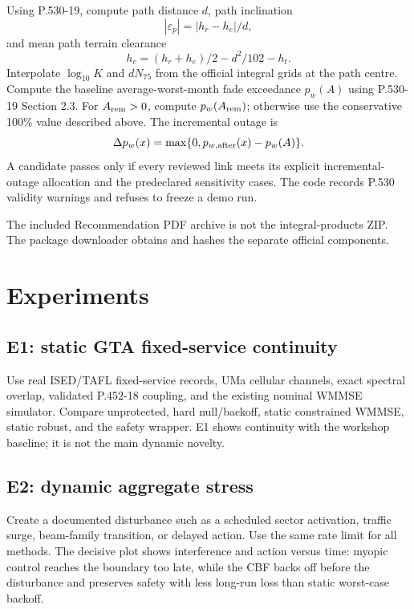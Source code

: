 \documentclass[11pt]{article}
\begin{document}
Using P.530-19, compute path distance $d$, path inclination
\begin{equation}
 |\varepsilon_p|=|h_r-h_e|/d,
\end{equation}
and mean path terrain clearance
\begin{equation}
 h_c=(h_r+h_e)/2-d^2/102-h_t.
\end{equation}
Interpolate $\log_{10}K$ and $dN_{75}$ from the official integral grids at the path centre. Compute the baseline average-worst-month fade exceedance $p_w(A)$ using P.530-19 Section 2.3. For $A_{\rm rem}>0$, compute $p_w(A_{\rm rem})$; otherwise use the conservative 100\% value described above. The incremental outage is
\begin{equation}
 \Delta p_w(x)=\max\{0,p_{w,\rm after}(x)-p_w(A)\}.
\end{equation}
A candidate passes only if every reviewed link meets its explicit incremental-outage allocation and the predeclared sensitivity cases. The code records P.530 validity warnings and refuses to freeze a demo run.

The included Recommendation PDF archive is not the integral-products ZIP. The package downloader obtains and hashes the separate official components.

\section{Experiments}

\subsection{E1: static GTA fixed-service continuity}

Use real ISED/TAFL fixed-service records, UMa cellular channels, exact spectral overlap, validated P.452-18 coupling, and the existing nominal WMMSE simulator. Compare unprotected, hard null/backoff, static constrained WMMSE, static robust, and the safety wrapper. E1 shows continuity with the workshop baseline; it is not the main dynamic novelty.

\subsection{E2: dynamic aggregate stress}

Create a documented disturbance such as a scheduled sector activation, traffic surge, beam-family transition, or delayed action. Use the same rate limit for all methods. The decisive plot shows interference and action versus time: myopic control reaches the boundary too late, while the CBF backs off before the disturbance and preserves safety with less long-run loss than static worst-case backoff.
\end{document}

